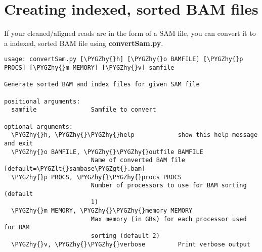 \documentclass[letterpaper,10pt,english]{sphinxmanual}
\def\PYGZlt{\char`\<}
\def\PYGZgt{\char`\>}
\def\PYGZhy{\char`\-}
\begin{document}
\section{Creating indexed, sorted BAM files}
\label{tutorial:creating-indexed-sorted-bam-files}
If your cleaned/aligned reads are in the form of a SAM file, you can convert it to a indexed,
sorted BAM file using \textbf{convertSam.py}.

\begin{Verbatim}[commandchars=\\\{\}]
usage: convertSam.py [\PYGZhy{}h] [\PYGZhy{}o BAMFILE] [\PYGZhy{}p PROCS] [\PYGZhy{}m MEMORY] [\PYGZhy{}v] samfile

Generate sorted BAM and index files for given SAM file

positional arguments:
  samfile               Samfile to convert

optional arguments:
  \PYGZhy{}h, \PYGZhy{}\PYGZhy{}help            show this help message and exit
  \PYGZhy{}o BAMFILE, \PYGZhy{}\PYGZhy{}outfile BAMFILE
                        Name of converted BAM file [default=\PYGZlt{}sambase\PYGZgt{}.bam]
  \PYGZhy{}p PROCS, \PYGZhy{}\PYGZhy{}procs PROCS
                        Number of processors to use for BAM sorting (default
                        1)
  \PYGZhy{}m MEMORY, \PYGZhy{}\PYGZhy{}memory MEMORY
                        Max memory (in GBs) for each processor used for BAM
                        sorting (default 2)
  \PYGZhy{}v, \PYGZhy{}\PYGZhy{}verbose         Print verbose output
\end{Verbatim}
\end{document}
